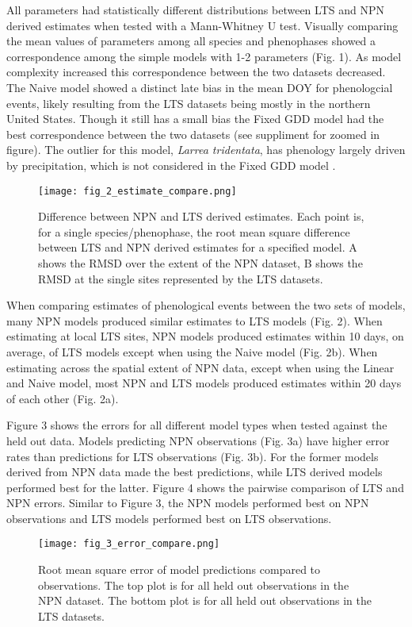 \documentclass[fleqn,10pt,lineno]{wlpeerj} %
\begin{document}
All parameters had statistically different distributions between LTS and NPN derived estimates when tested with a Mann-Whitney U test. Visually comparing the mean values of parameters among all species and phenophases showed a correspondence among the simple models with 1-2 parameters (Fig. 1). As model complexity increased this correspondence between the two datasets decreased. The Naive model showed a distinct late bias in the mean DOY for phenologcial events, likely resulting from the LTS datasets being mostly in the northern United States. Though it still has a small bias the Fixed GDD model had the best correspondence between the two datasets (see suppliment for zoomed in figure). The outlier for this model, \textit{Larrea tridentata}, has phenology largely driven by precipitation, which is not considered in the Fixed GDD model \citep{beatley1974}. 

\begin{figure}
	\centering
		\texttt{[image: fig\_2\_estimate\_compare.png]}
	\caption{Difference between NPN and LTS derived estimates. Each point is, for a single species/phenophase, the root mean square difference between LTS and NPN derived estimates for a specified model. A shows the RMSD over the extent of the NPN dataset, B shows the RMSD at the single sites represented by the LTS datasets.}
\end{figure}

When comparing estimates of phenological events between the two sets of models, many NPN models produced similar estimates to LTS models (Fig. 2). When estimating at local LTS sites, NPN models produced estimates within 10 days, on average, of LTS models except when using the Naive model (Fig. 2b). When estimating across the spatial extent of NPN data, except when using the Linear and Naive model, most NPN and LTS models produced estimates within 20 days of each other (Fig. 2a). 

Figure 3 shows the errors for all different model types when tested against the held out data. Models predicting NPN observations (Fig. 3a) have higher error rates than predictions for LTS observations (Fig. 3b). For the former models derived from NPN data made the best predictions, while LTS derived models performed best for the latter. Figure 4 shows the pairwise comparison of LTS and NPN errors. Similar to Figure 3, the NPN models performed best on NPN observations and LTS models performed best on LTS observations.

\begin{figure}
	\centering
		\texttt{[image: fig\_3\_error\_compare.png]}
	\caption{Root mean square error of model predictions compared to observations. The top plot is for all held out observations in the NPN dataset. The bottom plot is for all held out observations in the LTS datasets.}
\end{figure}
\end{document}
